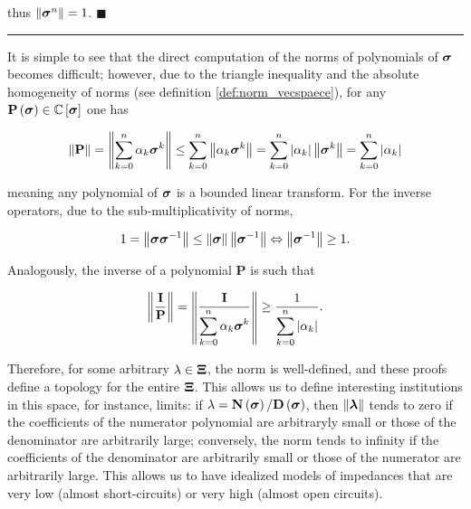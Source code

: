 	\noindent thus $\left\lVert \boldsymbol{\sigma}^{n}\right\rVert = 1$. \hfill$\blacksquare$
\vspace{3mm}
\hrule
\vspace{3mm}

	It is simple to see that the direct computation of the norms of polynomials of $\boldsymbol{\sigma}$ becomes difficult; however, due to the triangle inequality and the absolute homogeneity of norms (see definition \ref{def:norm_vecspaece}), for any $\mathbf{P}\left(\boldsymbol{\sigma}\right) \in \mathbb{C}\left[\boldsymbol{\sigma}\right]$ one has

\begin{equation} \left\lVert \mathbf{P}\right\rVert = \left\lVert \sum_{k=0}^n \alpha_k\boldsymbol{\sigma}^{k}\right\rVert \leq \sum_{k=0}^n \left\lVert \alpha_k\boldsymbol{\sigma}^{k}\right\rVert = \sum_{k=0}^n \left\lvert \alpha_k\right\rvert \left\lVert \boldsymbol{\sigma}^{k}\right\rVert = \sum_{k=0}^n \left\lvert \alpha_k\right\rvert \end{equation}

	\noindent meaning any polynomial of $\boldsymbol{\sigma}$ is a bounded linear transform. For the inverse operators, due to the sub-multiplicativity of norms,

\begin{equation} 1 = \left\lVert \boldsymbol{\sigma} \boldsymbol{\sigma}^{-1}\right\rVert \leq \left\lVert \boldsymbol{\sigma} \right\rVert \left\lVert\boldsymbol{\sigma}^{-1}\right\rVert \Leftrightarrow \left\lVert\boldsymbol{\sigma}^{-1}\right\rVert \geq 1 .\end{equation}

	Analogously, the inverse of a polynomial $\mathbf{P}$ is such that

\begin{equation} \left\lVert \dfrac{\mathbf{I}}{\mathbf{P}}\right\rVert = \raisebox{-3mm}{$ \left\lVert \raisebox{3mm}{$ \dfrac{\mathbf{I}}{\displaystyle\sum_{k=0}^n \alpha_k\ndpo{k}} $}\right\rVert $} \geq \dfrac{1}{\displaystyle\sum_{k=0}^n \left\lvert \alpha_k\right\rvert} . \label{eq:inverse_poly_norm} \end{equation}

	Therefore, for some arbitrary $\lambda\in\boldsymbol{\Xi}$, the norm is well-defined, and these proofs define a topology for the entire $\boldsymbol{\Xi}$. This allows us to define interesting institutions in this space, for instance, limits: if $\lambda = \mathbf{N}\left(\boldsymbol{\sigma}\right)/\mathbf{D}\left(\boldsymbol{\sigma}\right)$, then $\left\lVert \boldsymbol{\lambda}\right\rVert$ tends to zero if the coefficients of the numerator polynomial are arbitraryly small or those of the denominator are arbitrarily large; conversely, the norm tends to infinity if the coefficients of the denominator are arbitrarily small or those of the numerator are arbitrarily large. This allows us to have idealized models of impedances that are very low (almost short-circuits) or very high (almost open circuits).

